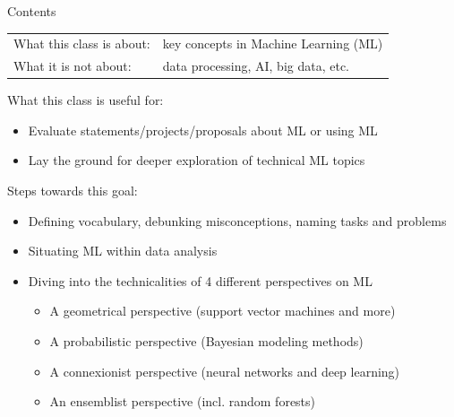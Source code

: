 \documentclass[10pt,a4paper,t,aspectratio=1610,dvipsnames]{beamer}
\begin{document}
\begin{frame}{Contents}
	\begin{tabular}{@{}ll}
		What this class is about: & key concepts in Machine Learning (ML)\\
		What it is not about: & data processing, AI, big data, etc.
	\end{tabular}
	
	\vspace{2em}
	\indent What this class is useful for:
	\begin{itemize}
		\item[] Evaluate statements/projects/proposals about ML or using ML
		\item[] Lay the ground for deeper exploration of technical ML topics
	\end{itemize}
	
	\vspace{2em}
	Steps towards this goal:
	\begin{itemize}
		\item Defining vocabulary, debunking misconceptions, naming tasks and problems
		\item Situating ML within data analysis
		\item Diving into the technicalities of 4 different perspectives on ML
		\begin{itemize}
			\item A geometrical perspective (support vector machines and more)
			\item A probabilistic perspective (Bayesian modeling methods)
			\item A connexionist perspective (neural networks and deep learning)
			\item An ensemblist perspective (incl. random forests)
		\end{itemize}
	\end{itemize}
\end{frame}
\end{document}
